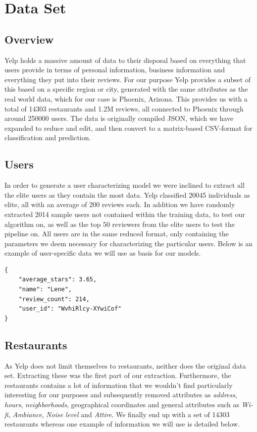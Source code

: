 \documentclass[10pt,twocolumn,letterpaper]{article}
\begin{document}

\section{Data Set}

\subsection{Overview}
Yelp holds a massive amount of data to their disposal based on everything that users provide in terms of personal information, business information and everything they put into their reviews. For our purpose Yelp provides a subset of this based on a specific region or city, generated with the same attributes as the real world data, which for our case is Phoenix, Arizona. This provides us with a total of 14303 restaurants and 1.2M reviews, all connected to Phoenix through around 250000 users. The data is originally compiled JSON, which we have expanded to reduce and edit, and then convert to a matrix-based CSV-format for classification and prediction.

\subsection{Users}
In order to generate a user characterizing model we were inclined to extract all the elite users as they contain the most data. Yelp classified 20045 individuals as elite, all with an average of 200 reviews each. In addition we have randomly extracted 2014 sample users not contained within the training data, to test our algorithm on, as well as the top 50 reviewers from the elite users to test the pipeline on. All users are in the same reduced format, only containing the parameters we deem necessary for characterizing the particular users. Below is an example of user-specific data we will use as basis for our models.

\begin{verbatim}
{
    "average_stars": 3.65,
    "name": "Lene",
    "review_count": 214,
    "user_id": "WvhiRlcy-XYwiCof"
}
\end{verbatim}

\subsection{Restaurants}
As Yelp does not limit themselves to restaurants, neither does the original data set. Extracting these was the first part of our extraction. Furthermore, the restaurants contains a lot of information that we wouldn't find particularly interesting for our purposes and subsequently removed attributes as \textit{address}, \textit{hours}, \textit{neighborhoods}, geographical coordinates and general attributes such as \textit{Wi-fi}, \textit{Ambiance}, \textit{Noise level} and \textit{Attire}. We finally end up with a set of 14303 restaurants whereas one example of information we will use is detailed below.
\end{document}
